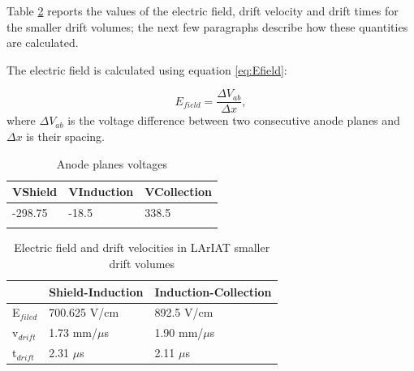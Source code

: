 Table \ref{tab:Efields} reports the values of the electric field, drift velocity and drift times for the smaller drift volumes; the next few paragraphs describe how these quantities are calculated.  

The electric field is calculated using equation \ref{eq:Efield}:

\begin{equation} E_{field}=\frac{\Delta V_{ab}}{\Delta x}, \label{eq:Efield}
\end{equation}
where $\Delta V_{ab}$ is the voltage difference between two consecutive anode planes and $\Delta x$ is their spacing.

\begin{table}[b!]
\centering
\caption{Anode planes voltages}
\label{tab:voltages}
\begin{tabular}{lll}
\hline
\multicolumn{1}{|l|}{VShield} & \multicolumn{1}{l|}{VInduction} & \multicolumn{1}{l|}{VCollection} \\ \hline
\multicolumn{1}{|l|}{-298.75} & \multicolumn{1}{l|}{-18.5}      & \multicolumn{1}{l|}{338.5}       \\ \hline
                              &                                 &                                 
\end{tabular}
\end{table}



 
\begin{table}[]
\centering
\caption{Electric field and drift velocities in LArIAT smaller drift volumes}
\label{tab:Efields}
\begin{tabular}{|l|l|l|}
\hline
& Shield-Induction & Induction-Collection \\ \hline
E$_{filed}$ &                 700.625 V/cm        &                892.5  V/cm             \\ \hline
v$_{drift}$ &                   1.73  mm/$\mu$s   &                  1.90 mm/$\mu$s        \\ \hline
t$_{drift}$ &                   2.31  $\mu$s      &                   2.11 $\mu$s          \\ \hline

\end{tabular}
\end{table}

